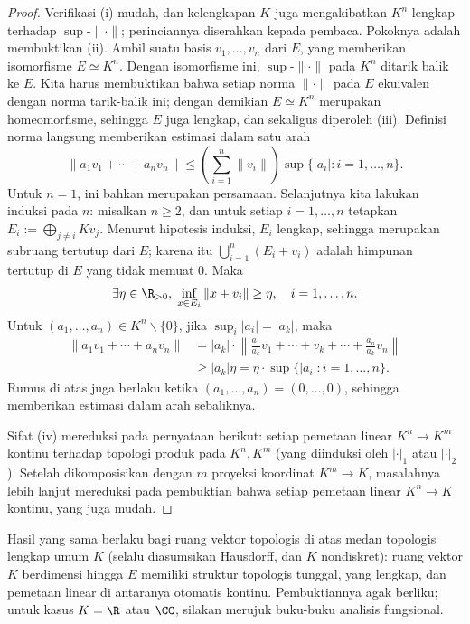 \begin{proof}
	Verifikasi (i) mudah, dan kelengkapan $K$ juga mengakibatkan $K^n$ lengkap terhadap $\sup\text{-}\|\cdot\|$; perinciannya diserahkan kepada pembaca. Pokoknya adalah membuktikan (ii). Ambil suatu basis $v_1, \ldots, v_n$ dari $E$, yang memberikan isomorfisme $E \simeq K^n$. Dengan isomorfisme ini, $\sup\text{-}\|\cdot\|$ pada $K^n$ ditarik balik ke $E$. Kita harus membuktikan bahwa setiap norma $\|\cdot\|$ pada $E$ ekuivalen dengan norma tarik-balik ini; dengan demikian $E \simeq K^n$ merupakan homeomorfisme, sehingga $E$ juga lengkap, dan sekaligus diperoleh (iii). Definisi norma langsung memberikan estimasi dalam satu arah
	\[ \| a_1 v_1 + \cdots + a_n v_n \| \leq \left( \sum_{i=1}^n \|v_i\| \right) \sup\{|a_i|: i=1, \ldots, n\}. \]
	Untuk $n=1$, ini bahkan merupakan persamaan. Selanjutnya kita lakukan induksi pada $n$: misalkan $n \geq 2$, dan untuk setiap $i=1, \ldots, n$ tetapkan $E_i := \bigoplus_{j \neq i} K v_j$. Menurut hipotesis induksi, $E_i$ lengkap, sehingga merupakan subruang tertutup dari $E$; karena itu $\bigcup_{i=1}^n (E_i + v_i)$ adalah himpunan tertutup di $E$ yang tidak memuat $0$. Maka
	\[ \exists \eta \in \R_{>0}, \; \inf_{x \in E_i} \|x + v_i \| \geq \eta, \quad i=1, \ldots, n. \]
	Untuk $(a_1, \ldots, a_n) \in K^n \smallsetminus \{0\}$, jika $\sup_i |a_i| = |a_k|$, maka
	\begin{align*}
		\| a_1 v_1 + \cdots + a_n v_n \| & = |a_k| \cdot \left\| \frac{a_1}{a_k} v_1 + \cdots + v_k + \cdots + \frac{a_n}{a_k} v_n \right\| \\
		& \geq |a_k| \eta = \eta \cdot \sup\{|a_i|: i=1, \ldots, n \}.
	\end{align*}
	Rumus di atas juga berlaku ketika $(a_1, \ldots, a_n)=(0, \ldots, 0)$, sehingga memberikan estimasi dalam arah sebaliknya.

	Sifat (iv) mereduksi pada pernyataan berikut: setiap pemetaan linear $K^n \to K^m$ kontinu terhadap topologi produk pada $K^n, K^m$ (yang diinduksi oleh $|\cdot|_1$ atau $|\cdot|_2$). Setelah dikomposisikan dengan $m$ proyeksi koordinat $K^m \to K$, masalahnya lebih lanjut mereduksi pada pembuktian bahwa setiap pemetaan linear $K^n \to K$ kontinu, yang juga mudah.
\end{proof}
\begin{remark}
	Hasil yang sama berlaku bagi ruang vektor topologis di atas medan topologis lengkap umum $K$ (selalu diasumsikan Hausdorff, dan $K$ nondiskret): ruang vektor $K$ berdimensi hingga $E$ memiliki struktur topologis tunggal, yang lengkap, dan pemetaan linear di antaranya otomatis kontinu. Pembuktiannya agak berliku; untuk kasus $K=\R$ atau $\CC$, silakan merujuk buku-buku analisis fungsional.
\end{remark}

